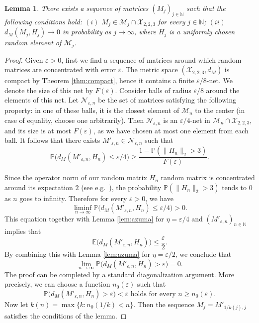 \documentclass[a4wider]{amsart}
\newtheorem{lemma}[theorem]{Lemma}
\theoremstyle{definitionbreak}\newtheorem{D}[theorem]{Definition}
\theoremstyle{definitionbreak}\newtheorem*{D*}{Definition}
\begin{document}
\begin{lemma} \label{lem:mn} There exists a sequence of matrices $(M_j)_{j\in \mathbb N}$ such that the following conditions hold: $(i)$ $M_j\in \mathcal M_j\cap \mathcal X_{2,2,3}$ for every $j\in \mathbb N$; $(ii)$ $d_M(M_j, H_j)\rightarrow 0$ in probability as $j\rightarrow\infty$, where $H_j$ is a uniformly chosen random element of $\mathcal M_j$. 
\end{lemma}
\begin{proof} Given $\varepsilon>0$, first we find a sequence  of matrices around which random matrices are concentrated with error $\varepsilon$. 
The metric space $(\mathcal X_{2,2,3}, d_M)$ is compact by Theorem \ref{thm:compact}, hence it contains a finite $\varepsilon/8$-net. We denote the size of this net by  $F(\varepsilon)$.  Consider balls of radius $\varepsilon/8$ around the elements of this net. Let $\mathcal N_{\varepsilon,n}$ be the set of matrices  satisfying the following property: in one of these balls, it is the closest element of $\mathcal M_n$ to the center (in case of equality, choose one arbitrarily). Then $\mathcal N_{\varepsilon, n}$ is an $\varepsilon/4$-net in $\mathcal M_n\cap \mathcal X_{2,2,3}$, and its size is at most $F(\varepsilon)$, as we have chosen at most one element from each ball. It follows that there exists $M'_{\varepsilon, n}\in \mathcal N_{\varepsilon,n}$ such that
\[\mathbb P\big(d_M(M'_{\varepsilon, n}, H_n)\leq \varepsilon/4\big)\geq \frac{1-\mathbb P(\|H_n\|_2>3)}{F(\varepsilon)}.\]  

Since the operator norm of our random matrix $H_n$ random matrix is concentrated around its expectation $2$ (see e.g.\ \cite{geman}), the probability  $\mathbb P(\|H_n\|_2>3)$ tends to $0$ as $n$ goes to infinity. Therefore for every $\varepsilon>0$, we have 
\[\liminf_{n\rightarrow\infty}\mathbb P\big(d_M(M'_{\varepsilon, n}, H_n)\leq \varepsilon/4)>0.\]
This equation together with Lemma \ref{lem:azuma} for $\eta=\varepsilon/4$ and $(M'_{\varepsilon, n})_{n\in \mathbb N}$ implies that 
\[\mathbb E\big(d_M(M'_{\varepsilon,n}, H_n)\big)\leq \frac{\varepsilon}{2}.\]
By combining this with  Lemma \ref{lem:azuma} for $\eta=\varepsilon/2$, we conclude that 
\[\lim_{n\rightarrow\infty}\mathbb P\big(d_M(M'_{\varepsilon,n}, H_n)>\varepsilon\big)=0.\]
The proof can be completed by a standard diagonalization argument. More precisely, we can choose a function $n_0(\varepsilon)$ such that 
\[\mathbb P\big(d_M(M'_{\varepsilon,n}, H_n)>\varepsilon\big)<\varepsilon \text{ holds for every } n\geq n_0(\varepsilon).\]
Now let $k(n)=\max\{k: n_0(1/k)<n\}$. Then the sequence $M_j=M'_{1/k(j),j}$ satisfies the conditions of the lemma. 
\end{proof}
\end{document}
